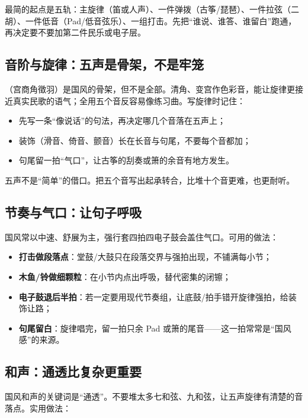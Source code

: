 最简的起点是五轨：主旋律（笛或人声）、一件弹拨（古筝/琵琶）、一件拉弦（二胡）、一件低音（Pad/低音弦乐）、一组打击。先把“谁说、谁答、谁留白”跑通，再决定要不要加第二件民乐或电子层。

\subsection{音阶与旋律：五声是骨架，不是牢笼}
\label{sec:guofeng-scale}

（宫商角徵羽）是国风的骨架，但不是全部。清角、变宫作色彩音，能让旋律更接近真实民歌的语气；全用五个音反容易像练习曲。写旋律时记住：

\begin{itemize}
\item 先写一条“像说话”的句法，再决定哪几个音落在五声上；
\item 装饰（滑音、倚音、颤音）长在长音与句尾，不要每个音都加；
\item 句尾留一拍“气口”，让古筝的刮奏或箫的余音有地方发生。
\end{itemize}

五声不是“简单”的借口。把五个音写出起承转合，比堆十个音更难，也更耐听。

\subsection{节奏与气口：让句子呼吸}
\label{sec:guofeng-groove}

国风常以中速、舒展为主，强行套四拍四电子鼓会盖住气口。可用的做法：

\begin{itemize}
\item \textbf{打击做段落点}：堂鼓/大鼓只在段落交界与强拍出现，不铺满每小节；
\item \textbf{木鱼/铃做细颗粒}：在小节内点出呼吸，替代密集的闭镲；
\item \textbf{电子鼓退后半拍}：若一定要用现代节奏组，让底鼓/拍手错开旋律强拍，给装饰让路；
\item \textbf{句尾留白}：旋律唱完，留一拍只余 Pad 或箫的尾音——这一拍常常是“国风感”的来源。
\end{itemize}

\subsection{和声：通透比复杂更重要}
\label{sec:guofeng-harmony}

国风和声的关键词是“通透”。不要堆太多七和弦、九和弦，让五声旋律有清楚的音落点。实用做法：

